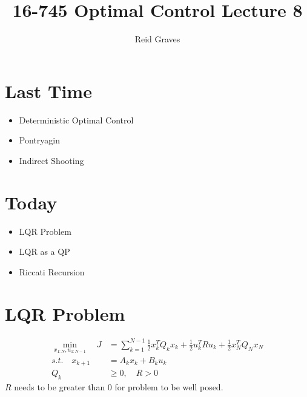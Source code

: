 \documentclass[11pt]{article}
\title{16-745 Optimal Control Lecture 8}
\author{Reid Graves}
\begin{document}
\maketitle

\section{Last Time}
\begin{itemize}
    \item Deterministic Optimal Control
    \item Pontryagin
    \item Indirect Shooting
\end{itemize}

\section{Today}
\begin{itemize}
    \item LQR Problem
    \item LQR as a QP
    \item Riccati Recursion
\end{itemize}

\section{LQR Problem}
\begin{align*}
    \min_{x_{1:N},u_{1:N-1}} \quad J &= \sum_{k=1}^{N-1}\frac{1}{2}x_k^TQ_kx_k + \frac{1}{2}u_k^TRu_k + \frac{1}{2}x_N^TQ_Nx_N
    \\
    s.t. \quad x_{k+1} &= A_kx_k + B_ku_k
    \\
    Q_k &\geq 0, \quad R>0
\end{align*}
$R$ needs to be greater than 0 for problem to be well posed. 
\end{document}
